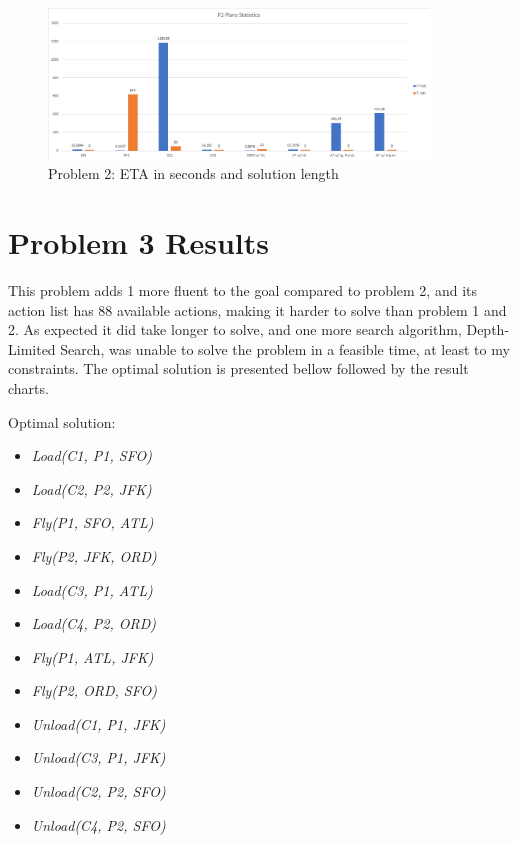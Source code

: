 \begin{figure}[ht]
	\centering
	\includegraphics[width=0.9\textwidth]{images/P2_plan_statistics.png}
	\caption{Problem 2: ETA in seconds and solution length}
	\label{fig:p2_plan_statistics}
\end{figure}

\section{Problem 3 Results}\label{sec:p3_results}

This problem adds 1 more fluent to the goal compared to problem 2, and its action list has 88 available actions, making it harder to solve than problem 1 and 2. As expected it did take longer to solve, and one more search algorithm, Depth-Limited Search, was unable to solve the problem in a feasible time, at least to my constraints. The optimal solution is presented bellow followed by the result charts.

\begin{flushleft}
	Optimal solution:
	\begin{itemize}
		\item \textit{Load(C1, P1, SFO)}
		\item \textit{Load(C2, P2, JFK)}
		\item \textit{Fly(P1, SFO, ATL)}
		\item \textit{Fly(P2, JFK, ORD)}
		\item \textit{Load(C3, P1, ATL)}
		\item \textit{Load(C4, P2, ORD)}
		\item \textit{Fly(P1, ATL, JFK)}
		\item \textit{Fly(P2, ORD, SFO)}
		\item \textit{Unload(C1, P1, JFK)}
		\item \textit{Unload(C3, P1, JFK)}
		\item \textit{Unload(C2, P2, SFO)}
		\item \textit{Unload(C4, P2, SFO)}
	\end{itemize}
\end{flushleft}


